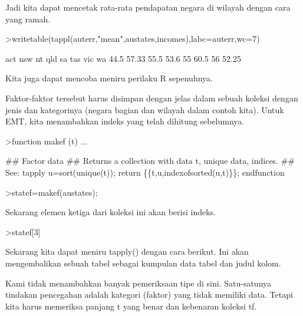 \documentclass{article}
\begin{document}
\begin{eulernotebook}
\begin{eulercomment}
Jadi kita dapat mencetak rata-rata pendapatan negara di wilayah dengan
cara yang ramah.
\end{eulercomment}
\begin{eulerprompt}
>writetable(tappl(auterr,"mean",austates,incomes),labc=auterr,wc=7)
\end{eulerprompt}
\begin{euleroutput}
      act    nsw     nt    qld     sa    tas    vic     wa
     44.5  57.33   55.5   53.6     55   60.5     56  52.25
\end{euleroutput}
\begin{eulercomment}
Kita juga dapat mencoba meniru perilaku R sepenuhnya.

Faktor-faktor tersebut harus disimpan dengan jelas dalam sebuah
koleksi dengan jenis dan kategorinya (negara bagian dan wilayah dalam
contoh kita). Untuk EMT, kita menambahkan indeks yang telah dihitung
sebelumnya.
\end{eulercomment}
\begin{eulerprompt}
>function makef (t) ...
\end{eulerprompt}
\begin{eulerudf}
  ## Factor data
  ## Returns a collection with data t, unique data, indices.
  ## See: tapply
  u=sort(unique(t));
  return \{\{t,u,indexofsorted(u,t)\}\};
  endfunction
\end{eulerudf}
\begin{eulerprompt}
>statef=makef(austates);
\end{eulerprompt}
\begin{eulercomment}
Sekarang elemen ketiga dari koleksi ini akan berisi indeks.
\end{eulercomment}
\begin{eulerprompt}
>statef[3]
\end{eulerprompt}
\begin{euleroutput}
  [6,  5,  4,  2,  2,  3,  8,  8,  4,  7,  2,  7,  4,  4,  5,  6,  5,  3,
  8,  7,  4,  2,  2,  8,  5,  1,  2,  7,  7,  1]
\end{euleroutput}
\begin{eulercomment}
Sekarang kita dapat meniru tapply() dengan cara berikut. Ini akan
mengembalikan sebuah tabel sebagai kumpulan data tabel dan judul
kolom.
\end{eulercomment}
\begin{eulercomment}
Kami tidak menambahkan banyak pemeriksaan tipe di sini. Satu-satunya
tindakan pencegahan adalah kategori (faktor) yang tidak memiliki data.
Tetapi kita harus memeriksa panjang t yang benar dan kebenaran koleksi
tf.


\end{eulercomment}
\end{eulernotebook}
\end{document}

